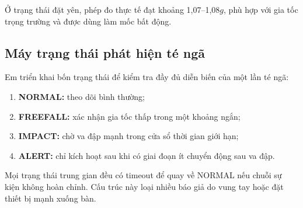 \documentclass[12pt]{article}
\begin{document}
Ở trạng thái đặt yên, phép đo thực tế đạt khoảng 1,07--1,08$g$, phù hợp với gia tốc trọng trường và được dùng làm mốc bất động.

\subsection{Máy trạng thái phát hiện té ngã}

Em triển khai bốn trạng thái để kiểm tra đầy đủ diễn biến của một lần té ngã:

\begin{enumerate}
  \item \textbf{NORMAL:} theo dõi bình thường;
  \item \textbf{FREEFALL:} xác nhận gia tốc thấp trong một khoảng ngắn;
  \item \textbf{IMPACT:} chờ va đập mạnh trong cửa sổ thời gian giới hạn;
  \item \textbf{ALERT:} chỉ kích hoạt sau khi có giai đoạn ít chuyển động sau va đập.
\end{enumerate}

Mọi trạng thái trung gian đều có timeout để quay về NORMAL nếu chuỗi sự kiện không hoàn chỉnh. Cấu trúc này loại nhiều báo giả do vung tay hoặc đặt thiết bị mạnh xuống bàn.
\end{document}
